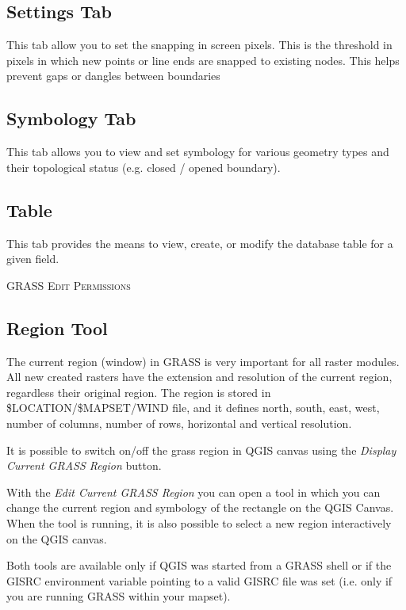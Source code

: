 \subsection{Settings Tab} 
This tab allow you to set the snapping in screen pixels. This is the threshold in pixels in which new points or line ends are snapped to existing nodes. This helps prevent gaps or dangles between boundaries

\subsection{Symbology Tab}
This tab allows you to view and set symbology for various geometry types and their topological status (e.g. closed / opened boundary).

\subsection{Table} 
This tab provides the means to view, create, or modify the database table for a given field.
\begin{Tip}\caption{\textsc{GRASS Edit Permissions}}
\end{Tip} 

\subsection{Region Tool}

The current region (window) in GRASS is very important for all 
raster modules. All new created rasters have the extension and resolution
of the current region, regardless their original region. 
The region is stored in \$LOCATION/\$MAPSET/WIND file, and it defines
north, south, east, west, number of columns, number of rows, 
horizontal and vertical resolution.

It is possible to switch on/off the grass region in QGIS canvas
using the \textsl{Display Current GRASS Region}
button. 

With the \textsl{Edit Current GRASS Region} you can open a tool 
in which you can change the current region and symbology
of the rectangle on the QGIS Canvas. When the tool is running,
it is also possible to select a new region interactively
on the QGIS canvas.

Both tools are available only if QGIS was started from a GRASS 
shell or if the GISRC environment variable pointing to a
valid GISRC file was set (i.e. only if you are running 
GRASS within your mapset).

